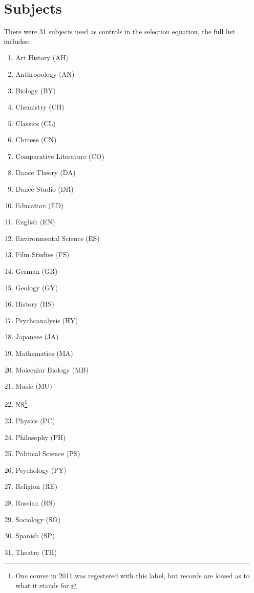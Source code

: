 \section{Subjects}\label{appendix:a}

There were 31 subjects used as controls in the selection equation, the full list includes:
\begin{multicols}{2}
  \begin{enumerate}
  \item{Art History (AH)} 
  \item{Anthropology (AN)}
  \item{Biology (BY)}
  \item{Chemistry (CH)}
  \item{Classics (CL)}
  \item{Chinese (CN)}
  \item{Comparative Literature (CO)}
  \item{Dance Theory (DA)}
  \item{Dance Studio (DR)}
  \item{Education (ED)}
  \item{English (EN)}
  \item{Environmental Science (ES)}
  \item{Film Studies (FS)}
  \item{German (GR)}
  \item{Geology (GY)}
  \item{History (HS)}
  \item{Psychoanalysis (HY)}
  \item{Japanese (JA)}
  \item{Mathematics (MA)}
  \item{Molecular Biology (MB)}
  \item{Music (MU)}
  \item{NS\footnote{One course in 2011 was regestered with this label, but records are lossed as to what it stands for.}}
  \item{Physics (PC)}
  \item{Philosophy (PH)}
  \item{Political Science (PS)}
  \item{Psychology (PY)}
  \item{Religion (RE)}
  \item{Russian (RS)}
  \item{Sociology (SO)}
  \item{Spanish (SP)}
  \item{Theatre (TH)}
  \end{enumerate}
\end{multicols}

